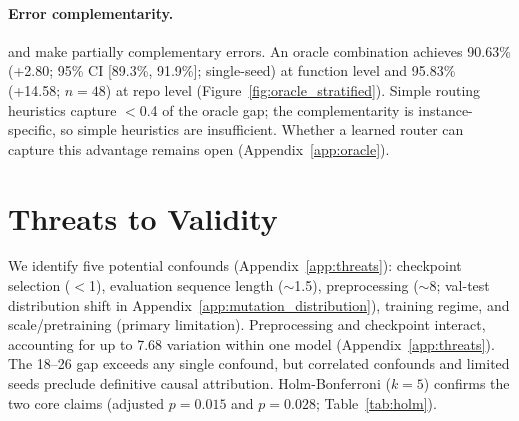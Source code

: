 \paragraph{Error complementarity.} \cls{} and \cwm{} make partially complementary errors. An oracle combination achieves 90.63\% (+2.80\pp{}; 95\% CI [89.3\%, 91.9\%]; single-seed) at function level and 95.83\% (+14.58\pp{}; $n{=}48$) at repo level (Figure~\ref{fig:oracle_stratified}). Simple routing heuristics capture $<$0.4\pp{} of the oracle gap; the complementarity is instance-specific, so simple heuristics are insufficient. Whether a learned router can capture this advantage remains open (Appendix~\ref{app:oracle}).

\section*{Threats to Validity}
\label{sec:threats}

We identify five potential confounds (Appendix~\ref{app:threats}): checkpoint selection ($<$1\pp{}), evaluation sequence length (${\sim}$1.5\pp{}), preprocessing (${\sim}$8\pp{}; val-test distribution shift in Appendix~\ref{app:mutation_distribution}), \traj{} training regime, and \cwm{} scale/pretraining (primary limitation). Preprocessing and checkpoint interact, accounting for up to 7.68\pp{} variation within one model (Appendix~\ref{app:threats}). The 18--26\pp{} gap exceeds any single confound, but correlated confounds and limited seeds preclude definitive causal attribution. Holm-Bonferroni ($k{=}5$) confirms the two core claims (adjusted $p{=}0.015$ and $p{=}0.028$; Table~\ref{tab:holm}).

\begin{table}[t]
\centering
\small
\caption{Holm-Bonferroni correction for primary comparisons ($k{=}5$). Comparisons ranked by raw $p$-value; each tested against $\alpha / (k - \text{rank} + 1)$.}
\label{tab:holm}
\setlength{\tabcolsep}{3pt}
\end{table}
